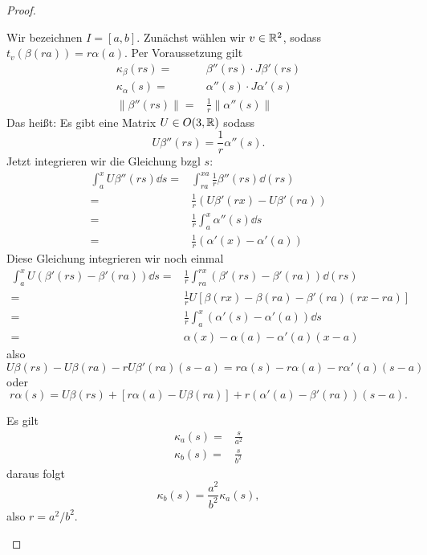 \begin{proof}
	\begin{parts}
	\item Wir bezeichnen $I=[a,b]$. Zunächst wählen wir $v\in \mathbb{R}^2$, sodass $t_v(\beta(ra))=r\alpha(a)$. Per Voraussetzung gilt
	\begin{align*}
		\kappa_\beta(rs)=&\beta''(rs)\cdot J\beta'(rs)\\
		\kappa_\alpha(s)=&\alpha''(s)\cdot J\alpha'(s)\\
		\|\beta''(rs)\|=&\frac{1}{r}\|\alpha''(s)\|
	\end{align*}
	Das heißt: Es gibt eine Matrix $U\in O(3,\mathbb{R})$ sodass
	\[
	U\beta''(rs)=\frac{1}{r}\alpha''(s)
	.\] 
	Jetzt integrieren wir die Gleichung bzgl $s$:
	\begin{align*}
		\int_a^x U\beta''(rs)\dd{s}=& \int_{ra}^{xa} \frac{1}{r}\beta''(rs)\dd{(rs)}\\
		=&\frac{1}{r}(U\beta'(rx) - U\beta'(ra))\\
		=&\frac{1}{r}\int_a^x \alpha''(s)\dd{s}\\
		=& \frac{1}{r}(\alpha'(x)-\alpha'(a))
	\end{align*}
	Diese Gleichung integrieren wir noch einmal
	\begin{align*}
		\int_a^x U(\beta'(rs)-\beta'(ra))\dd{s}=&\frac{1}{r}\int_{ra}^{rx} (\beta'(rs)-\beta'(ra))\dd{(rs)}\\
		=&\frac{1}{r}U[\beta(rx)-\beta(ra)-\beta'(ra)(rx-ra)]\\
		=&\frac{1}{r}\int_a^x (\alpha'(s)-\alpha'(a))\dd{s}\\
		=&\alpha(x)-\alpha(a)-\alpha'(a)(x-a)
	\end{align*}
	also
	\[
	U\beta(rs)-U\beta(ra)-rU\beta'(ra)(s-a)=r\alpha(s)-r\alpha(a)-r\alpha'(a)(s-a)
	\] 
	oder
	\[
	r\alpha(s)=U\beta(rs) + \left[ r\alpha(a)-U\beta(ra) \right]+r(\alpha'(a)-\beta'(ra))(s-a)
	.\] 
\item Es gilt
	\begin{align*}
		\kappa_a(s)=&\frac{s}{a^2}\\
		\kappa_b(s)=&\frac{s}{b^2}
	\end{align*}
	daraus folgt
	\[
	\kappa_b(s)=\frac{a^2}{b^2}\kappa_a(s)
	,\]
	also $r=a^2 / b^2$.\qedhere
\end{parts}
\end{proof}
